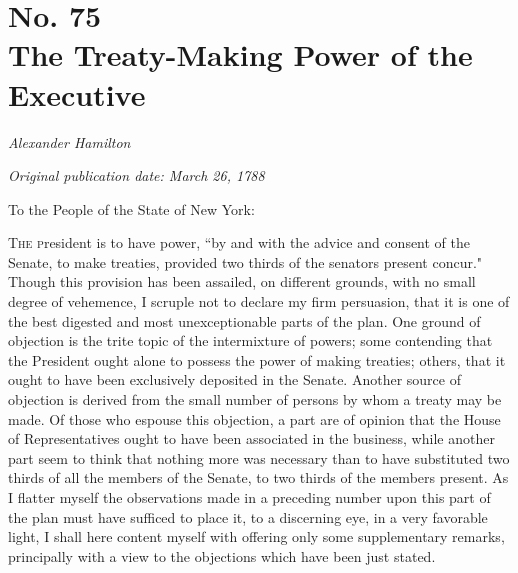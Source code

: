 \chapter[No. 75: The Treaty-Making Power of the Executive]{No. 75\\ {\small The Treaty-Making Power of the Executive}}

\textit{Alexander Hamilton}

\textit{Original publication date: March 26, 1788}
\vspace{1cm}

To the People of the State of New York:
\vspace{.4cm}

\textsc{The p}resident is to have power, ``by and with the advice and consent of the Senate, to make treaties, provided two thirds of the senators present concur." Though this provision has been assailed, on different grounds, with no small degree of vehemence, I scruple not to declare my firm persuasion, that it is one of the best digested and most unexceptionable parts of the plan. 
One ground of objection is the trite topic of the intermixture of powers; some contending that the President ought alone to possess the power of making treaties; others, that it ought to have been exclusively deposited in the Senate. 
Another source of objection is derived from the small number of persons by whom a treaty may be made. 
Of those who espouse this objection, a part are of opinion that the House of Representatives ought to have been associated in the business, while another part seem to think that nothing more was necessary than to have substituted two thirds of all the members of the Senate, to two thirds of the members present. 
As I flatter myself the observations made in a preceding number upon this part of the plan must have sufficed to place it, to a discerning eye, in a very favorable light, I shall here content myself with offering only some supplementary remarks, principally with a view to the objections which have been just stated.

